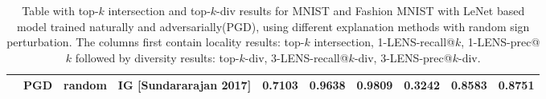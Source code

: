 \documentclass[letterpaper]{article} %
\begin{document}
\begin{table}[!ht]
\begin{center}
{\begin{tabular}{|l|l|c|c|c|c|c|c|c|c|}
      & PGD & random & IG [Sundararajan 2017]    & 0.7103 & 0.9638 & 0.9809 & 0.3242 & 0.8583 & 0.8751 \\ 
\hline
\end{tabular}
}
\end{center}
    \caption{Table with top-$k$ intersection and top-$k$-div results for MNIST and Fashion MNIST with LeNet based model trained naturally and adversarially(PGD), using different explanation methods with random sign perturbation. The columns first contain locality results: top-$k$ intersection, 1-LENS-recall@$k$, 1-LENS-prec@$k$ followed by diversity results: top-$k$-div, 3-LENS-recall@$k$-div, 3-LENS-prec@$k$-div.}
\label{table-topk-div-results-rand-mnist-fmnist}

\end{table}
\end{document}
